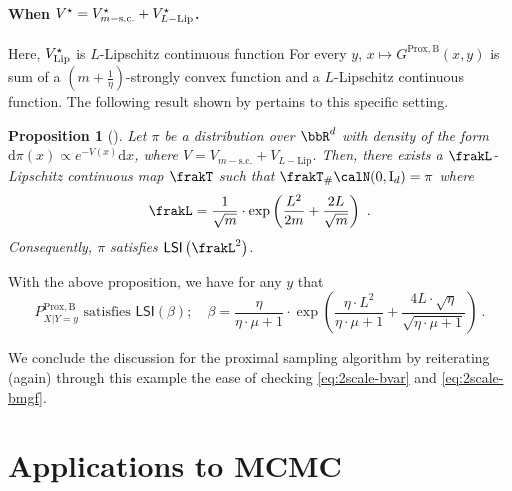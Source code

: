 \documentclass[11pt]{article}
\newtheorem{proposition}{Proposition}[section]
\newcounter{ct}
\newcommand{\rmd}{\mathrm{d}}
\newcommand{\rmI}{\mathrm{I}}
\newcommand{\potential}[1]{
    \ensuremath{\if$#1$V\else V(#1)\fi}
}
\newcommand{\LSI}[1]{\mathsf{LSI}\left(#1\right)}
\begin{document}
\paragraph{When \(\potential{}^{\star} = \potential{}^{\star}_{m-\text{s.c.}} + \potential{}^{\star}_{L-\text{Lip}}\).}
Here, \(\potential{}^{\star}_{\text{Lip}}\) is \(L\)-Lipschitz continuous function
For every \(y\), \(x \mapsto G^{\mathrm{Prox,B}}(x, y)\) is sum of a \(\left(m + \frac{1}{\eta}\right)\)-strongly convex function and a \(L\)-Lipschitz continuous function.
The following result shown by \citet{brigati2024heat} pertains to this specific setting.
\begin{proposition}[{\citep[Thm. 1.4]{brigati2024heat}}]
    Let \(\pi\) be a distribution over \(\bbR^{d}\) with density of the form \(\rmd\pi(x) \propto e^{-V(x)}\rmd x\), where \(V = V_{m-\text{s.c.}} + V_{L-\text{Lip}}\).
    Then, there exists a \(\frakL\)-Lipschitz continuous map \(\frakT\) such that \(\frakT_{\#}\calN(0, \rmI_{d}) = \pi\) where
    \begin{equation*}
        \frakL = \frac{1}{\sqrt{m}} \cdot \exp\left(\frac{L^{2}}{2m} + \frac{2L}{\sqrt{m}}\right)~.
    \end{equation*}
    Consequently, \(\pi\) satisfies \(\LSI{\frakL^{2}}\).
\end{proposition}
With the above proposition, we have for any \(y\) that
\begin{equation*}
    P^{\mathrm{Prox,B}}_{X | Y = y} \text{ satisfies } \LSI{\beta}; \quad \beta = \frac{\eta}{\eta \cdot \mu + 1} \cdot \exp\left(\frac{\eta \cdot L^{2}}{\eta \cdot \mu + 1} + \frac{4L \cdot \sqrt{\eta}}{\sqrt{\eta \cdot \mu + 1}}\right)~.
\end{equation*}

We conclude the discussion for the proximal sampling algorithm by reiterating (again) through this example the ease of checking \ref{eq:2scale-bvar} and \ref{eq:2scale-bmgf}.
\section{Applications to MCMC}
\label{sec:applications}
\end{document}
